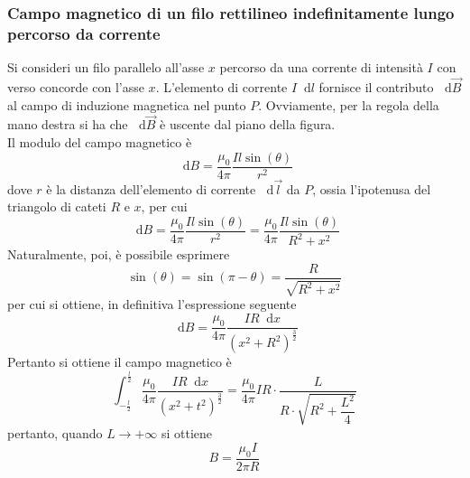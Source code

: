 \documentclass[a4paper]{extarticle}
\newcommand\dif{\mathop{}\!\mathrm{d}}
\begin{document}
\vspace{2em}
\subsubsection{Campo magnetico di un filo rettilineo indefinitamente lungo percorso da corrente}
Si consideri un filo parallelo all'asse $x$ percorso da una corrente di intensità $I$ con verso concorde con l'asse $x$. L'elemento di corrente $I \dif l$ fornisce il contributo $\dif \vec B$ al campo di induzione magnetica nel punto $P$. Ovviamente, per la regola della mano destra si ha che $\dif \vec B$ è uscente dal piano della figura.\\
Il modulo del campo magnetico è
\[\dif B = \dfrac{\mu_0}{4\pi} \dfrac{I l \sin(\theta)}{r^2}\]
dove $r$ è la distanza dell'elemento di corrente $\dif \vec l$ da $P$, ossia l'ipotenusa del triangolo di cateti $R$ e $x$, per cui
\[\dif B = \dfrac{\mu_0}{4\pi} \dfrac{I l \sin(\theta)}{r^2} = \dfrac{\mu_0}{4\pi} \dfrac{I l \sin(\theta)}{R^2+x^2}\]
Naturalmente, poi, è possibile esprimere
\[\sin(\theta)=\sin(\pi-\theta)=\dfrac{R}{\sqrt{R^2+x^2}}\]
per cui si ottiene, in definitiva l'espressione seguente
\[\dif B = \dfrac{\mu_0}{4\pi} \dfrac{I R \dif x}{\left(x^2+R^2\right)^{\frac{3}{2}}}\]
Pertanto si ottiene il campo magnetico è
\[\int_{-\frac{l}{2}}^{\frac{l}{2}} \dfrac{\mu_0}{4\pi} \dfrac{IR \dif x}{(x^2+t^2)^{\frac{3}{2}}} = \frac{\mu_0}{4\pi} IR \cdot \dfrac{L}{R \cdot \sqrt{R^2+\dfrac{L^2}{4}}}\]
pertanto, quando $L \to +\infty$ si ottiene
\[\boxed{B=\dfrac{\mu_0 I}{2 \pi R}}\]

\vspace{2em}
\end{document}
